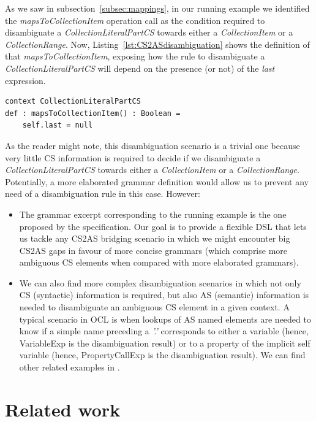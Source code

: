 \documentclass{llncs}
\begin{document}
As we saw in subsection~\ref{subsec:mappings}, in our running example we identified the \emph{mapsToCollectionItem} operation call as the condition required to disambiguate a \emph{CollectionLiteralPartCS} towards either a \emph{CollectionItem} or a \emph{CollectionRange}. Now, Listing~\ref{lst:CS2ASdisambiguation} shows the definition of that \emph{mapsToCollectionItem}, exposing how the rule to disambiguate a \emph{CollectionLiteralPartCS} will depend on the presence (or not) of the \emph{last} expression.

\begin{lstlisting}[caption=CS disambiguation rule of the running example, label=lst:CS2ASdisambiguation, language=OCL]
context CollectionLiteralPartCS
def : mapsToCollectionItem() : Boolean =
	self.last = null
\end{lstlisting}

As the reader might note, this disambiguation scenario is a trivial one because very little CS information is required to decide if we disambiguate a \emph{CollectionLiteralPartCS} towards either a \emph{CollectionItem} or a \emph{CollectionRange}. Potentially, a more elaborated grammar definition would allow us to prevent any need of a disambiguation rule in this case. However:

\begin{itemize}
\item The grammar excerpt corresponding to the running example is the one proposed by the specification. Our goal is to provide a flexible DSL that lets us tackle any CS2AS bridging scenario in which we might encounter big CS2AS gaps in favour of more concise grammars (which comprise more ambiguous CS elements when compared with more elaborated grammars).
\item We can also find more complex disambiguation scenarios in which not only CS (syntactic) information is required, but also AS (semantic) information is needed to disambiguate an ambiguous CS element in a given context. A typical scenario in OCL is when lookups of AS named elements are needed to know if a simple name preceding a \emph{'.'} corresponds to either a variable (hence, VariableExp is the disambiguation result) or to a property of the implicit self variable (hence, PropertyCallExp is the disambiguation result). We can find other related examples in \cite{willink2010oclXtext}.
\end{itemize}

\section{Related work}
\label{sec:relatedWork}
\end{document}
